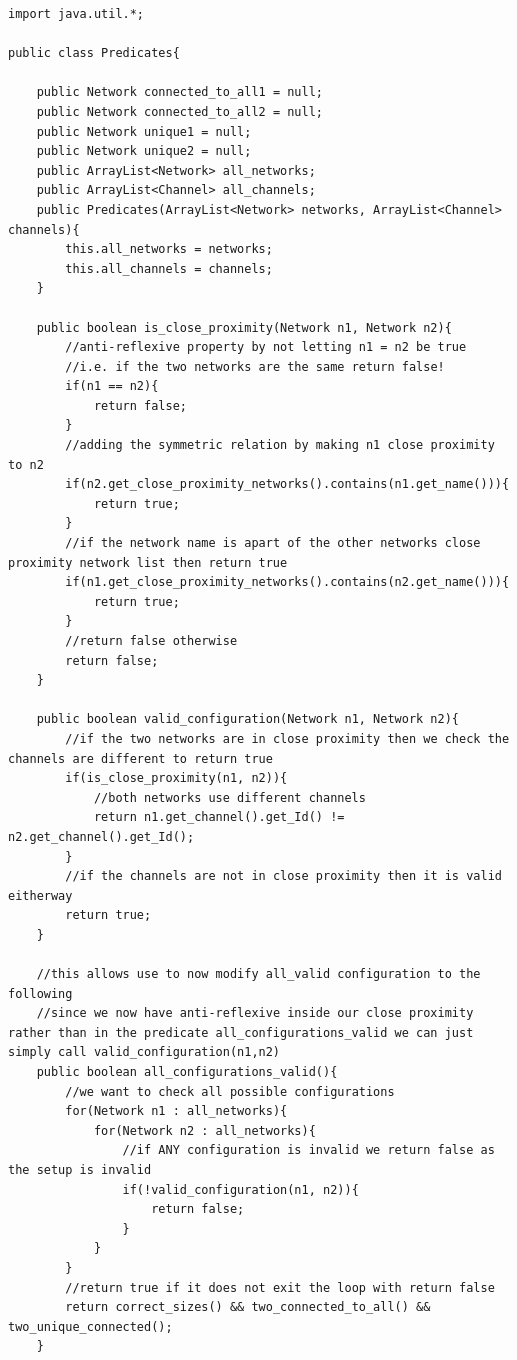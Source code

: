 \documentclass{article}
\begin{document}
\begin{lstlisting}
import java.util.*;

public class Predicates{

    public Network connected_to_all1 = null;
    public Network connected_to_all2 = null;
    public Network unique1 = null;
    public Network unique2 = null;
    public ArrayList<Network> all_networks;
    public ArrayList<Channel> all_channels;
    public Predicates(ArrayList<Network> networks, ArrayList<Channel> channels){
        this.all_networks = networks;
        this.all_channels = channels;
    }

    public boolean is_close_proximity(Network n1, Network n2){
        //anti-reflexive property by not letting n1 = n2 be true
        //i.e. if the two networks are the same return false!
        if(n1 == n2){
            return false;
        }
        //adding the symmetric relation by making n1 close proximity to n2
        if(n2.get_close_proximity_networks().contains(n1.get_name())){
            return true;
        }
        //if the network name is apart of the other networks close proximity network list then return true
        if(n1.get_close_proximity_networks().contains(n2.get_name())){
            return true;
        }
        //return false otherwise
        return false;
    }

    public boolean valid_configuration(Network n1, Network n2){
        //if the two networks are in close proximity then we check the channels are different to return true
        if(is_close_proximity(n1, n2)){
            //both networks use different channels
            return n1.get_channel().get_Id() != n2.get_channel().get_Id();
        }
        //if the channels are not in close proximity then it is valid eitherway
        return true;
    }

    //this allows use to now modify all_valid configuration to the following
    //since we now have anti-reflexive inside our close proximity rather than in the predicate all_configurations_valid we can just simply call valid_configuration(n1,n2)
    public boolean all_configurations_valid(){
        //we want to check all possible configurations
        for(Network n1 : all_networks){
            for(Network n2 : all_networks){
                //if ANY configuration is invalid we return false as the setup is invalid
                if(!valid_configuration(n1, n2)){
                    return false;
                }
            }
        }
        //return true if it does not exit the loop with return false
        return correct_sizes() && two_connected_to_all() && two_unique_connected();
    }


\end{lstlisting}
\end{document}
